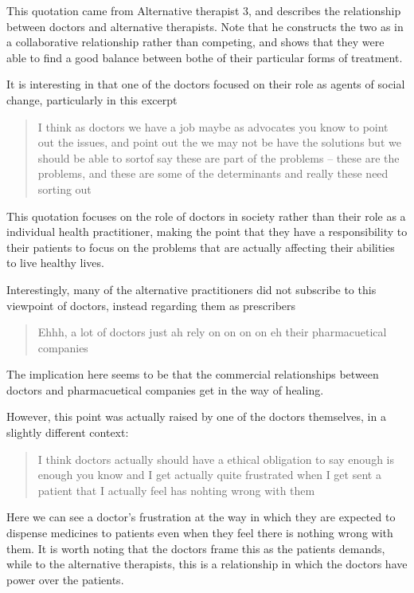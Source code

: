 This quotation came from Alternative therapist 3, and describes the relationship between doctors and alternative therapists. Note that he constructs the two as in a collaborative relationship rather than competing, and shows that they were able to find a good balance between bothe of their particular forms of treatment. 

It is interesting in that one of the doctors focused on their role as agents of social change, particularly in this excerpt

\begin{quotation}
   I think as doctors we have a job maybe as advocates you know to point out the issues, and point out the we may not be have the solutions but we should be able to sortof say these are part of the problems – these are the problems, and these are some of the determinants and really these need sorting out 

\end{quotation}

This quotation focuses on the role of doctors in society rather than their role as a individual health practitioner, making the point that they have a responsibility to their patients to focus on the problems that are actually affecting their abilities to live healthy lives. 

Interestingly, many of the alternative practitioners did not subscribe to this viewpoint of doctors, instead regarding them as prescribers 
\begin{quotation}
  Ehhh, a lot of doctors just ah rely on on on on eh their pharmacuetical companies 

\end{quotation}


The implication here seems to be that the commercial relationships between doctors and pharmacuetical companies get in the way of healing. 

However, this point was actually raised by one of the doctors themselves, in a slightly different context: 

\begin{quotation}
  I think doctors actually should have a ethical obligation to say enough is enough you know and I get actually quite frustrated when I get sent a patient that I actually feel has nohting wrong with them 

\end{quotation}

Here we can see a doctor's frustration at the way in which they are expected to dispense medicines to patients even when they feel there is nothing wrong with them. It is worth noting that the doctors frame this as the patients demands, while to the alternative therapists, this is a relationship in which the doctors have power over the patients. 

